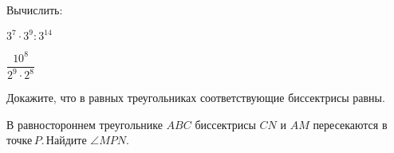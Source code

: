 	\begin{listofex}
		\item Вычислить:
	\begin{enumcols}[itemcolumns=2]
		\item \( 3^7\cdot3^9:3^{14} \)
		\item \( \dfrac{10^8}{2^9\cdot2^8} \)
	\end{enumcols}
	\item {}
	\item {}
	\item Докажите, что в равных треугольниках соответствующие биссектрисы равны.
	\item В равностороннем треугольнике \( ABC \) биссектрисы \( CN \) и \( AM \) пересекаются в точке \( P \). Найдите \( \angle MPN \).
	\item {}
	\item {}
	\item {}
	\item {}
\end{listofex}
%
%
%
%
%
%
%
